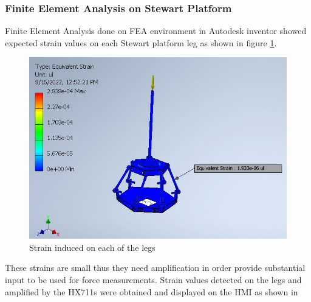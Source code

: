 \subsubsection{Finite Element Analysis on Stewart Platform}
Finite Element Analysis done on FEA environment in Autodesk inventor showed expected strain values on each
Stewart platform leg as shown in figure \ref{strain}.

\begin{center}
	\begin{figure}[H]
		\centering
		\includegraphics[width=0.6\linewidth]{Figures/Equivalent}
		\caption[Equivalent strain]{Strain induced on each of the legs}
		\label{strain}
	\end{figure}
\end{center}
These strains are small thus they need amplification in order provide
 substantial input to be used for force measurements. Strain values detected on the legs and amplified by the
 HX711s were obtained and displayed on the HMI as shown in 
